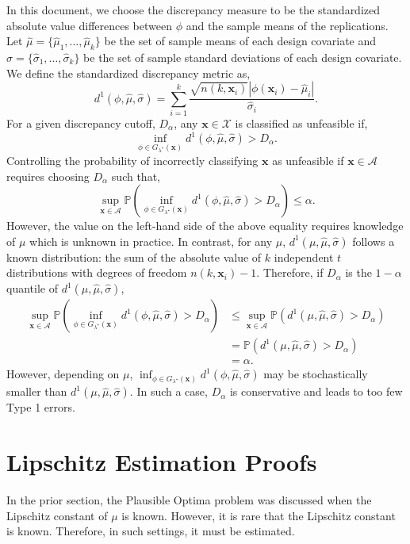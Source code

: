 \documentclass[12pt]{article}
\newcommand{\spa}[1]{\text{{$\mathcal{#1}$}}}
\newcommand{\des}{\ensuremath{\bm{x}}}
\newcommand{\vect}[1]{\ensuremath{\bm{#1}}}
\begin{document}
In this document, we choose the discrepancy measure to be the standardized absolute value differences between $\phi$ and the sample means of the replications. Let $\hat{\mu}=\{\hat{\mu}_1,\ldots,\hat{\mu}_k\}$ be the set of sample means of each design covariate and $\hat{\sigma}=\{\hat{\sigma}_1,\ldots,\hat{\sigma}_k\}$ be the set of sample standard deviations of each design covariate. We define the standardized discrepancy metric as,
$$d^1(\phi,\hat{\mu},\hat{\sigma})=\sum_{i=1}^k\frac{\sqrt{n(k,\des_i)}|\phi(\des_i)-\hat{\mu}_i|}{\hat{\sigma}_i}.$$
For a given discrepancy cutoff, $D_\alpha$, any $\vect{x} \in \spa{X}$ is classified as unfeasible if,
$$\inf_{\phi \in G_{\lambda^\star}(\vect{x})} d^1(\phi,\hat{\mu},\hat{\sigma})>D_\alpha.$$
Controlling the probability of incorrectly classifying $\vect{x}$ as unfeasible if $\vect{x} \in \mathcal{A}$ requires choosing $D_\alpha$ such that,
$$\sup_{\vect{x} \in \mathcal{A}} \mathbb{P}\left (\inf_{\phi \in G_{\lambda^\star}(\vect{x})} d^1(\phi,\hat{\mu},\hat{\sigma})>D_\alpha  \right )\leq \alpha.$$
However, the value on the left-hand side of the above equality requires knowledge of $\mu$ which is unknown in practice. In contrast, for any $\mu$, $d^1(\mu,\hat{\mu},\hat{\sigma})$ follows a known distribution: the sum of the absolute value of $k$ independent $t$ distributions with degrees of freedom $n(k,\des_i)-1$. Therefore, if $D_\alpha$ is the $1-\alpha$ quantile of $d^1(\mu,\hat{\mu},\hat{\sigma})$,
\begin{equation*}
    \begin{split}
        \sup_{\vect{x} \in \mathcal{A}} \mathbb{P}\left (\inf_{\phi \in G_{\lambda^\star}(\vect{x})} d^1(\phi,\hat{\mu},\hat{\sigma})>D_\alpha  \right )&\leq \sup_{\vect{x} \in \mathcal{A}} \mathbb{P}\left (d^1(\mu,\hat{\mu},\hat{\sigma})>D_\alpha  \right )\\
        & = \mathbb{P}\left (d^1(\mu,\hat{\mu},\hat{\sigma})>D_\alpha  \right ) \\
        & = \alpha.
    \end{split}
\end{equation*}
However, depending on $\mu$, $\inf_{\phi \in G_{\lambda^\star}(\vect{x})} d^1(\phi,\hat{\mu},\hat{\sigma})$ may be stochastically smaller than $d^1(\mu,\hat{\mu},\hat{\sigma})$. In such a case, $D_\alpha$ is conservative and leads to too few Type 1 errors. 


\section{Lipschitz Estimation Proofs}
In the prior section, the Plausible Optima problem was discussed when the Lipschitz constant of $\mu$ is known. However, it is rare that the Lipschitz constant is known. Therefore, in such settings, it must be estimated. 
\end{document}

